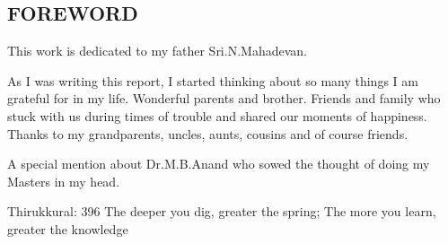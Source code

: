 \begin{center}
\section*{FOREWORD}
	This work is dedicated to my father Sri.N.Mahadevan.

As I was writing this report, I started thinking about so many things I am grateful for in my life. Wonderful parents and brother. Friends and family who stuck with us during times of trouble and shared our moments of happiness. Thanks to my grandparents, uncles, aunts, cousins and of course friends. 

A special mention about Dr.M.B.Anand who sowed the thought  of doing my Masters in my head. 

Thirukkural: 396
The deeper you dig, greater the spring;
The more you learn, greater the knowledge

\end{center}